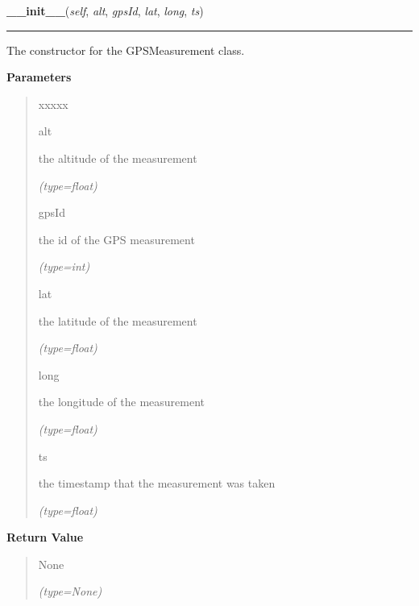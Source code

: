 \hspace{.8\funcindent}\begin{boxedminipage}{\funcwidth}

    \raggedright \textbf{\_\_init\_\_}(\textit{self}, \textit{alt}, \textit{gpsId}, \textit{lat}, \textit{long}, \textit{ts})

    \vspace{-1.5ex}

    \rule{\textwidth}{0.5\fboxrule}
\setlength{\parskip}{2ex}
    The constructor for the GPSMeasurement class.

\setlength{\parskip}{1ex}
      \textbf{Parameters}
      \vspace{-1ex}

      \begin{quote}
        \begin{Ventry}{xxxxx}

          \item[alt]

          the altitude of the measurement

            {\it (type=float)}

          \item[gpsId]

          the id of the GPS measurement

            {\it (type=int)}

          \item[lat]

          the latitude of the measurement

            {\it (type=float)}

          \item[long]

          the longitude of the measurement

            {\it (type=float)}

          \item[ts]

          the timestamp that the measurement was taken

            {\it (type=float)}

        \end{Ventry}

      \end{quote}

      \textbf{Return Value}
    \vspace{-1ex}

      \begin{quote}
      None

      {\it (type=None)}

      \end{quote}

    \end{boxedminipage}

